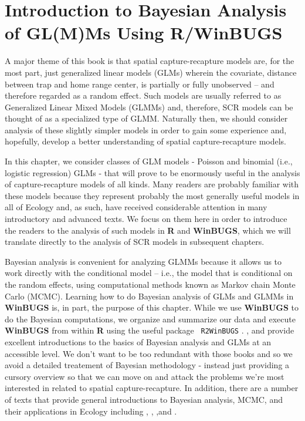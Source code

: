 \chapter{
Introduction to Bayesian Analysis of GL(M)Ms Using R/WinBUGS
}
\label{chapt.intro}

\vspace{.3in}


A major theme of this book is that spatial capture-recapture models
are, for the most part, just generalized linear models (GLMs) wherein
the covariate, distance between trap and home range center, is
partially or fully unobserved  -- and therefore regarded as 
a random effect. Such models
are usually referred to as Generalized Linear Mixed Models (GLMMs)
and, therefore, SCR models can be thought of as a specialized type of
GLMM. Naturally then, we should consider analysis of these slightly
simpler models in order to gain some experience and, hopefully,
develop a better understanding of spatial capture-recapture models.

In this chapter, we consider classes of GLM models - Poisson and
binomial (i.e., logistic regression) GLMs - that will prove to be
enormously useful in the analysis of capture-recapture models of all
kinds. Many readers are probably familiar with these models because
they represent probably 
the most generally useful models in all of Ecology and, as
such, have received considerable attention in many introductory and
advanced texts. We focus on them here in order to introduce the
readers to the analysis of such models in {\bf R} and {\bf WinBUGS}, 
which we will
translate directly to the analysis of SCR models in subsequent
chapters.  

Bayesian analysis is convenient for analyzing GLMMs because it allows
us to work directly with the conditional model -- i.e., the model that
is conditional on the random effects, using computational methods
known as Markov chain Monte Carlo (MCMC). Learning how to do Bayesian
analysis of GLMs and GLMMs in {\bf WinBUGS} is, in part, the purpose
of this chapter.  While we use {\bf WinBUGS} to do the Bayesian
computations, we organize and summarize our data and execute {\bf
  WinBUGS} from within {\bf R} using the useful package \mbox{\tt
  R2WinBUGS} \citep{sturtz_etal:2005}.  \citet{kery:2010}, and
\citet{kery_schaub:2011} provide excellent introductions to the basics
of Bayesian analysis and GLMs at an accessible level. We don't want to
be too redundant with those books and so we avoid a detailed
treatement of Bayesian methodology - instead just providing a cursory
overview so that we can move on and attack the problems we're most
interested in related to spatial capture-recapture.  In addition,
there are a number of texts that provide general introductions to
Bayesian analysis, MCMC, and their applications in Ecology including
\citet{mccarthy:2007}, \citet{kery:2010}, \citet{link_barker:2009},and
\citet{king_etal:2009}.


